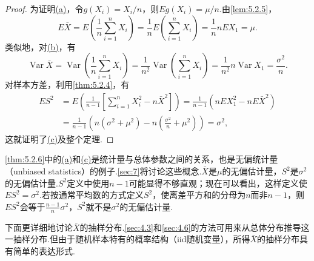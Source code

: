 \begin{proof}
为证明\hyperref[item:5.2.6a]{(a)}，令$g(X_i)=X_i/n$，则$Eg(X_i)=\mu/n$.由\autoref{lem:5.2.5}，
$$E\bar X=E\left(\frac1n\sum_{i=1}^nX_i\right)=\frac1nE\left(\sum_{i=1}^nX_i\right)=\frac1n nEX_1=\mu.$$
类似地，对\hyperref[item:5.2.6b]{(b)}，有
$$\operatorname{Var}\bar X=\operatorname{Var}\left(\frac1n\sum_{i=1}^n X_i\right)=\frac1{n^2}\operatorname{Var}\left(\sum_{i=1}^nX_i\right)=\frac1{n^2}n\operatorname{Var}X_1=\frac{\sigma^2}{n}.$$
对样本方差，利用\autoref{thm:5.2.4}，有
\begin{align*}
ES^2&=E\left(\frac1{n-1}\left[\sum_{i=1}^nX_i^2-n\bar X^2\right]\right)=\frac1{n-1}(nEX_1^2-nE\bar X^2)\\
&=\frac1{n-1}\left(n(\sigma^2+\mu^2)-n\left(\frac{\sigma^2}{n}+\mu^2\right)\right)=\sigma^2,
\end{align*}
这就证明了\hyperref[item:5.2.6c]{(c)}及整个定理.
\end{proof}
\autoref{thm:5.2.6}中的\hyperref[item:5.2.6a]{(a)}和\hyperref[item:5.2.6c]{(c)}是统计量与总体参数之间的关系，也是无偏统计量（unbiased statistics）的例子.\autoref{sec:7}将讨论这些概念.$\bar X$是$\mu$的无偏估计量，$S^2$是$\sigma^2$的无偏估计量.$S^2$定义中使用$n-1$可能显得不够直观；现在可以看出，这样定义使$ES^2=\sigma^2$.若按通常平均数的方式定义$S^2$，使离差平方和的分母为$n$而非$n-1$，则$ES^2$会等于$\frac{n-1}{n}\sigma^2$，$S^2$就不是$\sigma^2$的无偏估计量.

下面更详细地讨论$\bar X$的抽样分布.\autoref{sec:4.3}和\autoref{sec:4.6}的方法可用来从总体分布推导这一抽样分布.但由于随机样本特有的概率结构（iid随机变量），所得$\bar X$的抽样分布具有简单的表达形式.

